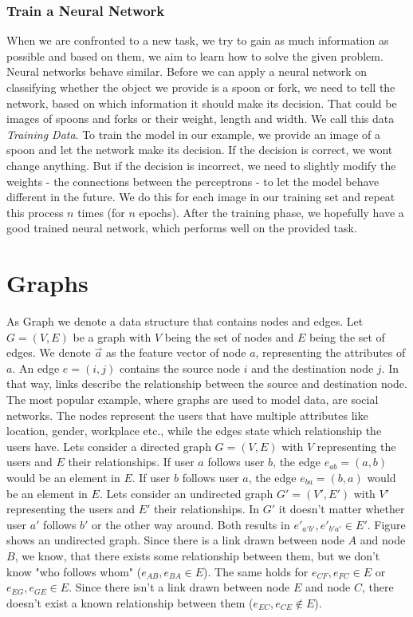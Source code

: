     \subsubsection*{Train a Neural Network}

      When we are confronted to a new task, we try to gain as much information as possible and based on them, we aim to learn how to solve the given problem.
      Neural networks behave similar.
      Before we can apply a neural network on classifying whether the object we provide is a spoon or fork, we need to tell the network, based on which information it should make its decision.
      That could be images of spoons and forks or their weight, length and width.
      We call this data \emph{Training Data}.
      To train the model in our example, we provide an image of a spoon and let the network make its decision.
      If the decision is correct, we wont change anything.
      But if the decision is incorrect, we need to slightly modify the weights - the connections between the perceptrons - to let the model behave different in the future.
      We do this for each image in our training set and repeat this process $n$ times (for $n$ epochs).
      After the training phase, we hopefully have a good trained neural network, which performs well on the provided task.

	\section{Graphs}

		As Graph we denote a data structure that contains nodes and edges. 
    Let $G = (V, E)$ be a graph with $V$ being the set of nodes and $E$ being the set of edges.
    We denote $\overrightarrow{a}$ as the feature vector of node $a$, representing the attributes of $a$.
    An edge $e = (i,j)$ contains the source node $i$ and the destination node $j$.
    In that way, links describe the relationship between the source and destination node. 
    The most popular example, where graphs are used to model data, are social networks. 
    The nodes represent the users that have multiple attributes like location, gender, workplace etc., while the edges state which relationship the users have.
    Lets consider a directed graph $G = (V,E)$ with $V$ representing the users and $E$ their relationships.
    If user $a$ follows user $b$, the edge $e_{ab} = (a,b)$ would be an element in $E$.
    If user $b$ follows user $a$, the edge $e_{ba} = (b,a)$ would be an element in $E$.
    Lets consider an undirected graph $G' = (V',E')$ with $V'$ representing the users and $E'$ their relationships.
    In $G'$ it doesn't matter whether user $a'$ follows $b'$ or the other way around. 
    Both results in $e'_{a'b'}, e'_{b'a'} \in E'$.
    Figure  shows an undirected graph.
    Since there is a link drawn between node $A$ and node $B$, we know, that there exists some relationship between them, but we don't know "who follows whom" ($e_{AB}, e_{BA} \in E$).
    The same holds for $e_{CF}, e_{FC} \in E$ or $e_{EG}, e_{GE} \in E$.
    Since there isn't a link drawn between node $E$ and node $C$, there doesn't exist a known relationship between them ($e_{EC}, e_{CE} \not\in E$).

